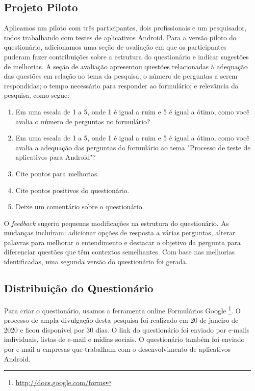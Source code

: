 \subsection{Projeto Piloto}

Aplicamos um piloto com três participantes, dois profissionais e um pesquisador, todos trabalhando com testes de aplicativos Android. Para a versão piloto do questionário, adicionamos uma seção de avaliação em que os participantes puderam fazer contribuições sobre a estrutura do questionário e indicar sugestões de melhorias. A seção de avaliação apresentou questões relacionadas à adequação das questões em relação ao tema da pesquisa; o número de perguntas a serem respondidas; o tempo necessário para responder ao formulário; e relevância da pesquisa, como segue:

\begin{enumerate}
    \item Em uma escala de 1 a 5, onde 1 é igual a ruim e 5 é igual a ótimo, como você avalia o número de perguntas no formulário?
    \item Em uma escala de 1 a 5, onde 1 é igual a ruim e 5 é igual a ótimo, como você avalia a adequação das perguntas do formulário ao tema "Processo de teste de aplicativos para Android"?
    \item Cite pontos para melhorias.
    \item Cite pontos positivos do questionário.
    \item Deixe um comentário sobre o questionário.
\end{enumerate}

O \textit{feedback} sugeriu pequenas modificações na estrutura do questionário. As mudanças incluíram: adicionar opções de resposta a várias perguntas, alterar palavras para melhorar o entendimento e destacar o objetivo da pergunta para diferenciar questões que têm contextos semelhantes. Com base nas melhorias identificadas, uma segunda versão do questionário foi gerada.

\subsection{Distribuição do Questionário}

Para criar o questionário, usamos a ferramenta online Formulários Google \footnote{\url{http://docs.google.com/forms}}. O processo de ampla divulgação desta pesquisa foi realizado em 20 de janeiro de 2020 e ficou disponível por 30 dias. O link do questionário foi enviado por e-mails individuais, listas de e-mail e mídias sociais. O questionário também foi enviado por e-mail a empresas que trabalham com o desenvolvimento de aplicativos Android.

